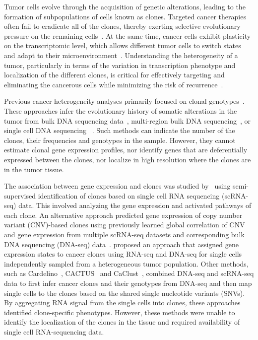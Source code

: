 \documentclass[unnumsec,webpdf,contemporary,large]{oup-authoring-template}%
\theoremstyle{thmstyleone}%
\theoremstyle{thmstyletwo}%
\theoremstyle{thmstylethree}%
\begin{document}
Tumor cells evolve through the acquisition of  genetic alterations, leading to the formation of subpopulations of cells known as clones. Targeted cancer therapies often fail to eradicate all of the clones, thereby exerting selective evolutionary pressure on the remaining cells~\citep{greaves2012clonal}. At the same time, cancer cells exhibit plasticity on the transcriptomic level, which allows different tumor cells to switch states and adapt to their microenvironment~\citep{yuan2019cellular}. Understanding the heterogeneity of a tumor, particularly in terms of the variation in transcription phenotype and localization of the different clones, is critical for effectively targeting and eliminating the cancerous cells while minimizing the risk of recurrence~\citep{meacham2013tumour}.


 Previous cancer heterogeneity analyses primarily focused on clonal genotypes~\citep{Tarabichi2021}.  These approaches  infer the evolutionary history of somatic alterations in the tumor from bulk DNA sequencing data~\citep{beerenwinkel_cancer_2015,beerenwinkel_computational_2016,vandin_computational_2017, jiang2016assessing, roth_pyclone_2014, deshwar_phylowgs_2015},  multi-region bulk DNA sequencing~\citep{de2014spatial}, or single cell DNA sequencing ~\citep{markowska2022conet,kang2022sieve, Kang2024}. Such methods can indicate the number of the clones, their frequencies and genotypes in the sample. However, they cannot estimate clonal gene expression profiles, nor identify genes that are deferentially expressed between the clones, nor localize in high resolution where the clones are in the tumor tissue. 

 The association between gene expression and clones was studied by~\cite{kim2015single} using semi-supervised identification of clones based on single cell RNA sequencing (scRNA-seq) data. This involved analyzing the gene expression and activated pathways of each clone. An alternative approach predicted gene expression of copy number variant (CNV)-based clones using previously learned global correlation of CNV and gene expression from multiple scRNA-seq datasets and corresponding bulk DNA sequencing (DNA-seq) data~\citep{muller2018conics}. \cite{campbell2019} proposed an approach that assigned gene expression states to cancer clones using RNA-seq and DNA-seq for single cells independently sampled from a heterogeneous tumor population.  Other methods, such as Cardelino~\citep{mccarthy2020cardelino}, CACTUS~\citep{shafighi2021cactus} and CaClust~\citep{Oksza-Orzechowski2024}, combined DNA-seq and scRNA-seq data to first infer cancer clones and their genotypes from DNA-seq and then map single cells to the clones based on the shared single nucleotide variants (SNVs). By aggregating RNA signal from the single cells into clones, these approaches identified clone-specific phenotypes. However, these methods were unable to identify the localization of the clones in the tissue and required availability of single cell RNA-sequencing data. 
\end{document}
